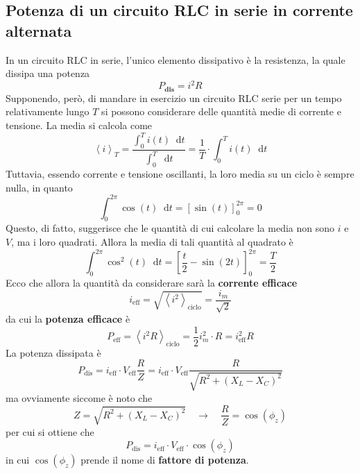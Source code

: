 \documentclass[a4paper]{extarticle}
\newcommand\dif{\mathop{}\!\mathrm{d}}
\begin{document}
\vspace{1em}
\subsection{Potenza di un circuito RLC in serie in corrente alternata}
In un circuito RLC in serie, l'unico elemento dissipativo è la resistenza, la quale dissipa una potenza
\[P_\textbf{dis}=i^2 R\]
Supponendo, però, di mandare in esercizio un circuito RLC serie per un tempo relativamente lungo $T$ si possono considerare delle quantità medie di corrente e tensione. La media si calcola come
\[\left<i\right>_T = \dfrac{\displaystyle{\int_0^T i(t) \dif t}}{\displaystyle{\int_0^T \dif t}} = \dfrac{1}{T} \cdot \int_0^T i(t) \dif t\]
Tuttavia, essendo corrente e tensione oscillanti, la loro media su un ciclo è sempre nulla, in quanto
\[\int_{0}^{2\pi} \cos(t) \dif t = \left[\sin(t)\right]_0^{2\pi} = 0\]
Questo, di fatto, suggerisce che le quantità di cui calcolare la media non sono $i$ e $V$, ma i loro quadrati. Allora la media di tali quantità al quadrato è
\[\int_{0}^{2\pi} \cos^2(t) \dif t = \left[\dfrac{t}{2}-\sin(2t)\right]_0^{2\pi} = \dfrac{T}{2}\]
Ecco che allora la quantità da considerare sarà la \textbf{corrente efficace}
\[i_\text{eff} = \sqrt{\left<i^2\right>_\text{ciclo}} = \dfrac{i_m}{\sqrt{2}}\]
da cui la \textbf{potenza efficace} è
\[P_\text{eff} = \left<i^2 R\right>_\text{ciclo} = \dfrac{1}{2} i^2_m \cdot R  = i_\text{eff}^2 R\]
La potenza dissipata è
\[P_\text{dis} = i_\text{eff} \cdot V_\text{eff} \dfrac{R}{Z} = i_\text{eff} \cdot V_\text{eff} \dfrac{R}{\sqrt{R^2+(X_L-X_C)^2}}\]
ma ovviamente siccome è noto che
\[Z=\sqrt{R^2+(X_L-X_C)^2} \hspace{1em} \rightarrow \hspace{1em} \dfrac{R}{Z}=\cos(\phi_z)\]
per cui si ottiene che
\[P_\text{dis} = i_\text{eff} \cdot V_\text{eff} \cdot \cos(\phi_z)\]
in cui $\cos(\phi_z)$ prende il nome di \textbf{fattore di potenza}.
\end{document}
